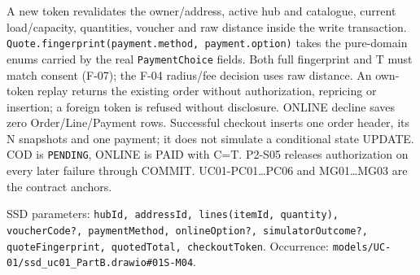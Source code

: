 A new token revalidates the owner/address, active hub and catalogue, current load/capacity, quantities, voucher and raw distance inside the write transaction. \texttt{Quote.\allowbreak{}fingerprint(payment.\allowbreak{}method, payment.\allowbreak{}option)} takes the pure-domain enums carried by the real \texttt{PaymentChoice} fields. Both full fingerprint and T must match consent (F-07); the F-04 radius/fee decision uses raw distance. An own-token replay returns the existing order without authorization, repricing or insertion; a foreign token is refused without disclosure. ONLINE decline saves zero Order/Line/Payment rows. Successful checkout inserts one order header, its N snapshots and one payment; it does not simulate a conditional state UPDATE. COD is \texttt{PENDING}, ONLINE is PAID with C=T. P2-S05 releases authorization on every later failure through COMMIT. UC01-PC01\ldots{}PC06 and MG01\ldots{}MG03 are the contract anchors.

SSD parameters: \texttt{hubId, addressId, lines(itemId, quantity), voucherCode?, paymentMethod, onlineOption?, simulatorOutcome?, quoteFingerprint, quotedTotal, checkoutToken}. Occurrence: \texttt{models/\allowbreak{}UC-01/\allowbreak{}ssd\_\allowbreak{}uc01\_\allowbreak{}PartB.\allowbreak{}drawio\#01S-M04}.

